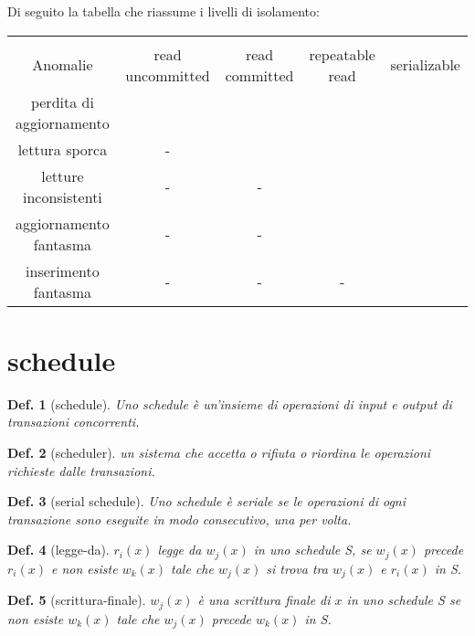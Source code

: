 \documentclass{article}
\newtheorem{definition}{Def.}[section]
\begin{document}
Di seguito la tabella che riassume i livelli di isolamento:
\begin{center}
	\begin{tabular}{|c|c|c|c|c|}
		\hline
		& & & & \\
		Anomalie & read uncommitted & read committed & repeatable read & 
		serializable \\
		\hline
		perdita di aggiornamento & \checkmark & \checkmark & \checkmark & 
		\checkmark \\
		\hline
		lettura sporca & - & \checkmark & \checkmark & \checkmark \\
		\hline
		letture inconsistenti & - & - & \checkmark & \checkmark \\
		\hline
		aggiornamento fantasma & - & - & \checkmark  & \checkmark \\
		\hline
		inserimento fantasma & - & - & - & \checkmark \\
		\hline
	\end{tabular}
\end{center}

\section{schedule}

\begin{definition}[schedule]
	Uno schedule è un'insieme di operazioni di input e output di transazioni
	concorrenti.
\end{definition}

\begin{definition}[scheduler]
	un sistema che accetta o rifiuta o riordina le operazioni richieste dalle
	transazioni.
\end{definition}

\begin{definition}[serial schedule]
	Uno schedule è seriale se le operazioni di ogni transazione sono eseguite
	in modo consecutivo, una per volta.
\end{definition}

\begin{definition}[legge-da]
	$r_i(x)$ legge da $w_j(x)$ in uno schedule S, se $w_j(x)$ precede $r_i(x)$
	e non esiste $w_k(x)$ tale che $w_j(x)$ si trova tra $w_j(x)$ e $r_i(x)$ in
	S.
\end{definition}

\begin{definition}[scrittura-finale]
	$w_j(x)$ è una scrittura finale di $x$ in uno schedule S se non esiste
	$w_k(x)$ tale che $w_j(x)$ precede $w_k(x)$ in S.
\end{definition}
\end{document}
